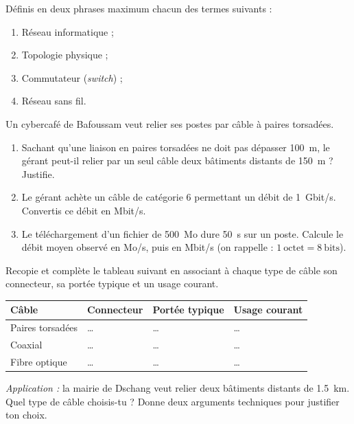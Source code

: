 \documentclass[11pt]{article}
\newcounter{popsec}
\newcounter{popsub}
\newcommand{\courssub}[1]{%
  \stepcounter{popsub}%
  \par\vspace{9pt}\noindent{\popxbold\fontsize{11.5}{13}\selectfont\color{popink}{\color{poporange}\thepopsec.\thepopsub}\hspace{6pt}#1}\par\nopagebreak\vspace{4pt}
}
\begin{document}
\begin{exercice}[Définitions]
Définis en deux phrases maximum chacun des termes suivants :
\begin{enumerate}
  \item Réseau informatique ;
  \item Topologie physique ;
  \item Commutateur (\emph{switch}) ;
  \item Réseau sans fil.
\end{enumerate}
\end{exercice}

\begin{exercice}
Un cybercafé de Bafoussam veut relier ses postes par câble à paires torsadées.
\begin{enumerate}
  \item Sachant qu'une liaison en paires torsadées ne doit pas dépasser \SI{100}{m}, le gérant peut-il relier par un seul câble deux bâtiments distants de \SI{150}{m} ? Justifie.
  \item Le gérant achète un câble de catégorie 6 permettant un débit de \SI{1}{Gbit/s}. Convertis ce débit en Mbit/s.
  \item Le téléchargement d'un fichier de \SI{500}{Mo} dure \SI{50}{s} sur un poste. Calcule le débit moyen observé en Mo/s, puis en Mbit/s (on rappelle : $1~\text{octet} = 8~\text{bits}$).
\end{enumerate}
\end{exercice}

\courssub{Je m'entraîne}

\begin{exercice}
Recopie et complète le tableau suivant en associant à chaque type de câble son connecteur, sa portée typique et un usage courant.

\begin{center}
\begin{tabularx}{\linewidth}{|l|X|X|X|}
\hline
\rowcolor{popblueL} \textbf{Câble} & \textbf{Connecteur} & \textbf{Portée typique} & \textbf{Usage courant} \\
\hline
Paires torsadées & \ldots & \ldots & \ldots \\
\hline
Coaxial & \ldots & \ldots & \ldots \\
\hline
Fibre optique & \ldots & \ldots & \ldots \\
\hline
\end{tabularx}
\end{center}

\emph{Application :} la mairie de Dschang veut relier deux bâtiments distants de \SI{1,5}{km}. Quel type de câble choisis-tu ? Donne deux arguments techniques pour justifier ton choix.
\end{exercice}
\end{document}
